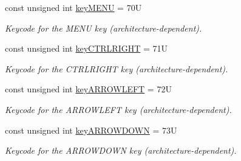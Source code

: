 \begin{DoxyCompactItemize}
\mbox{\label{namespacecimg__library__suffixed_1_1cimg_a9534831ac0ec2ecbf9a1d26022480dc9}} 
const unsigned int \hyperlink{namespacecimg__library__suffixed_1_1cimg_a9534831ac0ec2ecbf9a1d26022480dc9}{key\+M\+E\+NU} = 70U
\begin{DoxyCompactList}\small\item\em Keycode for the {\ttfamily M\+E\+NU} key (architecture-\/dependent). \end{DoxyCompactList}\item 
\mbox{\label{namespacecimg__library__suffixed_1_1cimg_a8187a390b54cd9834e48cac34eca6206}} 
const unsigned int \hyperlink{namespacecimg__library__suffixed_1_1cimg_a8187a390b54cd9834e48cac34eca6206}{key\+C\+T\+R\+L\+R\+I\+G\+HT} = 71U
\begin{DoxyCompactList}\small\item\em Keycode for the {\ttfamily C\+T\+R\+L\+R\+I\+G\+HT} key (architecture-\/dependent). \end{DoxyCompactList}\item 
\mbox{\label{namespacecimg__library__suffixed_1_1cimg_a9d027704e1f8ec8a703ae440b341bbaa}} 
const unsigned int \hyperlink{namespacecimg__library__suffixed_1_1cimg_a9d027704e1f8ec8a703ae440b341bbaa}{key\+A\+R\+R\+O\+W\+L\+E\+FT} = 72U
\begin{DoxyCompactList}\small\item\em Keycode for the {\ttfamily A\+R\+R\+O\+W\+L\+E\+FT} key (architecture-\/dependent). \end{DoxyCompactList}\item 
\mbox{\label{namespacecimg__library__suffixed_1_1cimg_a62ce43b399203b00686f166174461e54}} 
const unsigned int \hyperlink{namespacecimg__library__suffixed_1_1cimg_a62ce43b399203b00686f166174461e54}{key\+A\+R\+R\+O\+W\+D\+O\+WN} = 73U
\begin{DoxyCompactList}\small\item\em Keycode for the {\ttfamily A\+R\+R\+O\+W\+D\+O\+WN} key (architecture-\/dependent). \end{DoxyCompactList}\item 
\mbox{\label{namespacecimg__library__suffixed_1_1cimg_a53356b50ce24342226fb50c6091105f6}} 

\end{DoxyCompactItemize}
